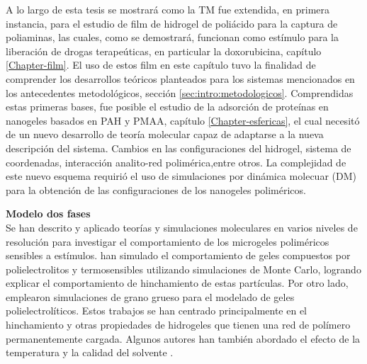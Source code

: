 A lo largo de esta tesis se mostrar\'a como la TM fue extendida, en primera instancia, para el estudio de film de hidrogel  de poli\'acido para la captura de poliaminas, las cuales, como se demostrar\'a, funcionan como est\'imulo para la liberaci\'on de drogas terape\'uticas, en particular la doxorubicina, cap\'itulo \ref{Chapter-film}.
El uso de estos film en este cap\'itulo tuvo la finalidad de comprender los desarrollos te\'oricos planteados para los sistemas mencionados en los antecedentes metodol\'ogicos, secci\'on \ref{sec:intro:metodologicos}.
Comprendidas estas primeras bases, fue posible el estudio de la adsorci\'on de prote\'inas en nanogeles basados en PAH y PMAA, cap\'itulo \ref{Chapter-esfericas},  el cual necesit\'o de un nuevo desarrollo de teor\'ia molecular capaz de adaptarse a la nueva descripci\'on del sistema.  Cambios en las configuraciones del hidrogel, sistema de coordenadas, interacci\'on analito-red polim\'erica,entre otros.
La complejidad de este nuevo esquema requiri\'o el uso de simulaciones por din\'amica molecuar (DM)  para la obtenci\'on de las configuraciones de los nanogeles  polim\'ericos.


\textbf{Modelo dos fases} \\

Se han descrito y aplicado teor\'ias y simulaciones moleculares en varios niveles de resoluci\'on para investigar el comportamiento de los microgeles polim\'ericos sensibles a est\'imulos.
\citet{quesada2011gel} han simulado el comportamiento de geles compuestos por polielectrolitos y termosensibles utilizando simulaciones de Monte Carlo, logrando explicar el comportamiento de hinchamiento de estas part\'iculas. Por otro lado, \citet{ahualli2016coarse} emplearon simulaciones de grano grueso para el modelado de geles polielectrol\'iticos. Estos trabajos se han centrado principalmente en el hinchamiento y otras propiedades de hidrogeles que tienen una red de pol\'imero permanentemente cargada. Algunos autores han tambi\'en abordado el efecto de la temperatura y la calidad del solvente \cite{Jha2011, QuesadaPerez2013, moncho-jorda2016a, ahualli2016coarse, AdroherBenitez2017PCCP}.

